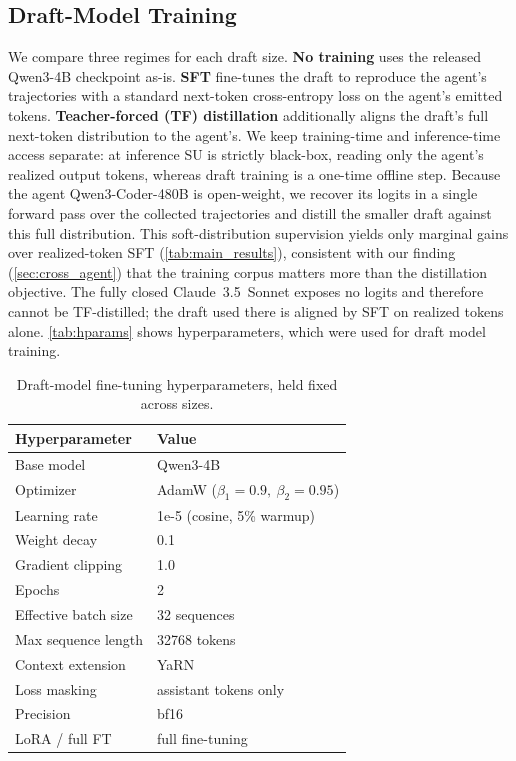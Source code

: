 \documentclass[11pt]{article}
\newcommand{\Hnumber}[1]{#1}
\begin{document}
\subsection{Draft-Model Training}
We compare three regimes for each draft size. \textbf{No training} uses the released Qwen3-4B
checkpoint as-is. \textbf{SFT} fine-tunes the draft to reproduce the agent's trajectories with a
standard next-token cross-entropy loss on the agent's emitted tokens. \textbf{Teacher-forced (TF)
distillation} additionally aligns the draft's full next-token distribution to the agent's. We keep
training-time and inference-time access separate: at inference SU is strictly black-box, reading
only the agent's realized output tokens, whereas draft training is a one-time offline step. Because
the agent Qwen3-Coder-480B is open-weight, we recover its logits in a single forward pass over the
collected trajectories and distill the smaller draft against this full distribution. This
soft-distribution supervision yields only marginal gains over realized-token SFT
(\autoref{tab:main_results}), consistent with our finding (\autoref{sec:cross_agent}) that the training
corpus matters more than the distillation objective. The fully closed Claude~3.5~Sonnet exposes no
logits and therefore cannot be TF-distilled; the draft used there is aligned by SFT on realized
tokens alone.
\autoref{tab:hparams} shows hyperparameters, which were used for draft model training.

\begin{table}[h]
\centering
\caption{Draft-model fine-tuning hyperparameters, held fixed across sizes.}
\label{tab:hparams}
\small
\setlength{\tabcolsep}{5pt}
\begin{tabular}{@{}ll@{}}
\toprule
\textbf{Hyperparameter} & \textbf{Value} \\
\midrule
Base model           & \Hnumber{Qwen3-4B} \\
Optimizer            & \Hnumber{AdamW} ($\beta_1{=}0.9,\ \beta_2{=}0.95$) \\
Learning rate        & \Hnumber{1e-5} (cosine, \Hnumber{5}\% warmup) \\
Weight decay         & \Hnumber{0.1} \\
Gradient clipping    & \Hnumber{1.0} \\
Epochs               & \Hnumber{2} \\
Effective batch size & \Hnumber{32} sequences \\
Max sequence length  & \Hnumber{32768} tokens \\
Context extension    & \Hnumber{YaRN} \\
Loss masking         & \Hnumber{assistant tokens only} \\
Precision            & \Hnumber{bf16} \\
LoRA / full FT       & \Hnumber{full fine-tuning} \\
\bottomrule
\end{tabular}
\end{table}
\end{document}

